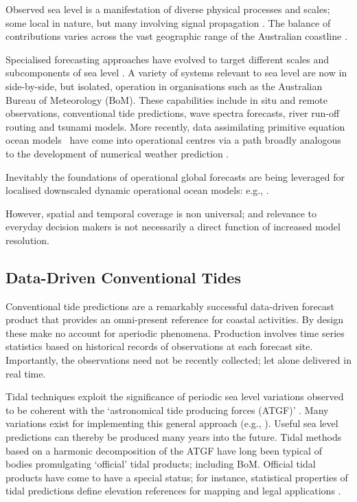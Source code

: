 Observed sea level is a manifestation of diverse physical processes and scales; some local in nature, but many involving signal propagation \cite{Melet:2016dd}.
The balance of contributions varies across the vast geographic range of the Australian coastline \cite{Haigh:2013bn,Haigh:2013he,Woodham:2013cl,Ridgway:2004kb,Church:1986tl,Allen:2009tf}.

Specialised forecasting approaches have evolved to target different scales and subcomponents of sea level \cite{Cartwright:2000tt,Petersen:2012kp}.
A variety of systems relevant to sea level are now in side-by-side, but isolated, operation in organisations such as the Australian Bureau of Meteorology (BoM). 
These capabilities include in situ and remote observations, conventional tide predictions, wave spectra forecasts, river run-off routing and tsunami models. 
More recently, data assimilating primitive equation ocean models~\cite{Schiller:2011di} have come into operational centres via a path broadly analogous to the development of numerical weather prediction \cite{Harper:kb}. 

Inevitably the foundations of operational global forecasts are being leveraged for localised downscaled dynamic operational ocean models: e.g., \cite{Paramygin:2017dx,Yang:2016ep,Wei:2014ex,Peng:2014kq}.

However, spatial and temporal coverage is non universal; and relevance to everyday decision makers is not necessarily a direct function of increased model resolution.  


\subsection{Data-Driven Conventional Tides}
\label{sec:tide_intro}

Conventional tide predictions are a remarkably successful data-driven forecast product that provides an omni-present reference for coastal activities.
By design these make no account for aperiodic phenomena. 
Production involves time series statistics based on historical records of observations at each forecast site.
Importantly, the observations need not be recently collected; let alone delivered in real time.

Tidal techniques exploit the significance of periodic sea level variations observed to be coherent with the `astronomical tide producing forces (ATGF)' \cite{Hendershott:1981ub}.     
Many variations exist for implementing this general approach (e.g., \cite{Foreman:2009bg,Groves:1975ky,LEFFLER:2009ej,Smith:1997ut} ). 
Useful sea level predictions can thereby be produced many years into the future.  
Tidal methods based on a harmonic decomposition of the ATGF have long been typical of bodies promulgating `official' tidal products; including BoM.
Official tidal products have come to have a special status; for instance, statistical properties of tidal predictions define elevation references for mapping and legal applications \cite{PCTMSL-sp9}.


